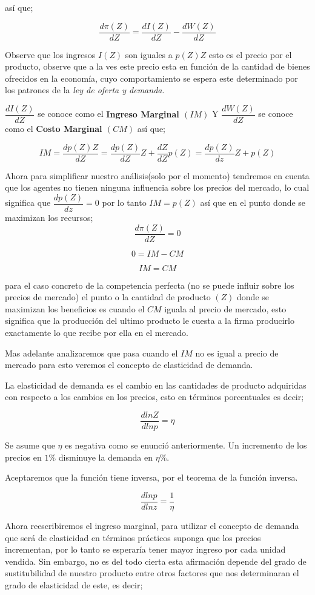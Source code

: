 \documentclass[12pt]{article}
\begin{document}
así que;

$$\dfrac{ d \pi(Z)}{dZ} = \dfrac{dI(Z)}{dZ}- \dfrac{dW(Z)}{dZ}$$

Observe que los ingresos $I(Z)$ son iguales a $p(Z)Z$ esto es el precio por el producto, observe que a la ves este precio esta en función  de la cantidad de bienes ofrecidos en la economía, cuyo comportamiento se espera este determinado por los patrones de la \textit{ley de oferta y demanda}.

$\dfrac{dI(Z)}{dZ}$ se conoce como el \textbf{Ingreso Marginal $(IM)$} Y $\dfrac{dW(Z)}{dZ}$ se conoce como el \textbf{Costo Marginal $(CM)$} así que;


$$IM = \dfrac{dp(Z)Z}{dZ} = \dfrac{dp(Z)}{dZ}Z + \dfrac{dZ}{dZ}p(Z)= \dfrac{dp(Z)}{dz}Z+p(Z)$$


Ahora para simplificar nuestro análisis(solo por el momento) tendremos en cuenta que los agentes no tienen ninguna influencia sobre los precios del mercado, lo cual significa que $\dfrac{dp(Z)}{dz}=0$
por lo tanto $IM=p(Z)$ así que en el punto donde se maximizan los recursos; $$\dfrac{d\pi(Z)}{dZ}=0$$ 

$$0= IM-CM$$

$$IM=CM$$

para el caso concreto de la competencia perfecta (no se puede influir sobre los precios de mercado) el punto o la cantidad de producto $(Z)$ donde se maximizan los beneficios es cuando el $CM$ iguala al precio de mercado, esto significa que la producción del ultimo producto le cuesta a la firma producirlo exactamente lo que recibe por ella en el mercado. 

Mas adelante analizaremos que pasa cuando el $IM$ no es igual a precio de mercado para esto veremos el concepto de elasticidad de demanda.


La elasticidad de demanda es el cambio en las cantidades de producto adquiridas con respecto a los cambios en los precios, esto en términos porcentuales es decir;


$$\dfrac{dlnZ}{dlnp}=\eta$$

Se asume que $\eta$ es negativa como se enunció anteriormente. Un incremento de los precios en $ 1\%$  disminuye la demanda en $\eta \%.$

Aceptaremos que la función tiene inversa, por el teorema de la función inversa.

$$\dfrac{dlnp}{dlnz}=\dfrac{1}{\eta}$$

Ahora reescribiremos el ingreso marginal, para utilizar el concepto de demanda que será de elasticidad en términos prácticos suponga que los precios incrementan, por lo tanto se esperaría tener mayor ingreso por cada unidad vendida. Sin embargo,  no es del todo cierta esta afirmación depende del grado de sustitubilidad de nuestro producto entre otros factores que nos determinaran el grado de elasticidad de este, es decir;
\end{document}
